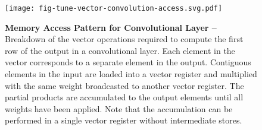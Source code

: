 
\begin{figure}[h]

  \centering
  \texttt{[image: fig-tune-vector-convolution-access.svg.pdf]}

  \caption{\textbf{Memory Access Pattern for Convolutional Layer --}
    Breakdown of the vector operations required to compute the first row
    of the output in a convolutional layer. Each element in the vector
    corresponds to a separate element in the output. Contiguous elements
    in the input are loaded into a vector register and multiplied with
    the same weight broadcasted to another vector register. The partial
    products are accumulated to the output elements until all weights
    have been applied. Note that the accumulation can be performed in a
    single vector register without intermediate stores.}

  \label{fig-tuning-vectorization-convolution-access}

\end{figure}

